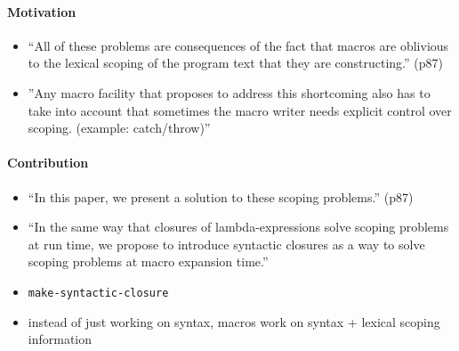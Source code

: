 \documentclass[12pt]{article}	%
\begin{document}
\paragraph{Motivation}
\begin{itemize}
	\item ``All of these problems are consequences of the fact that macros are oblivious to the lexical scoping of the program text that they are constructing.'' (p87)
	\item ''Any macro facility that proposes to address this shortcoming also has to take into account that sometimes the macro writer needs explicit control over scoping. (example: catch/throw)''
\end{itemize}
\paragraph{Contribution}
\begin{itemize}
	\item ``In this paper, we present a solution to these scoping problems.'' (p87)
	\item ``In the same way that closures of lambda-expressions solve scoping problems at run time, we propose to introduce syntactic closures as a way to solve scoping problems at macro expansion time.''
	\item \verb!make-syntactic-closure!
	\item instead of just working on syntax, macros work on syntax + lexical scoping information
\end{itemize}
\end{document}
